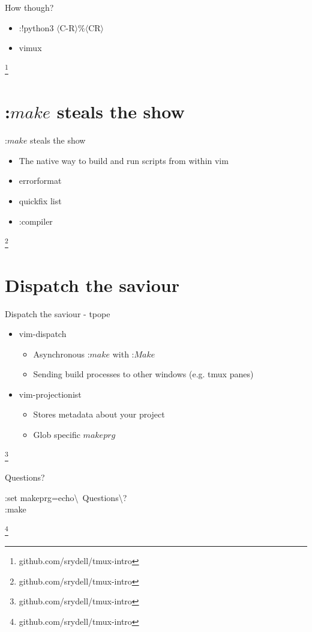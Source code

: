\documentclass[12pt]{beamer}
\newcommand\blfootnote[1]{%
  \begingroup
  \renewcommand\thefootnote{}\footnote{#1}%
  \addtocounter{footnote}{-1}%
  \endgroup
}
\begin{document}
\begin{frame}{How though?}
    \begin{itemize}
        \item :!python3 $\langle$C-R$\rangle\%\langle$CR$\rangle$
        \item vimux
    \end{itemize}
    \blfootnote{github.com/srydell/tmux-intro}
\end{frame}

\section{:$make$ steals the show}

\begin{frame}{:$make$ steals the show}
    \begin{itemize}
        \item The native way to build and run scripts from within vim
        \item errorformat
        \item quickfix list
        \item :compiler
    \end{itemize}
    \blfootnote{github.com/srydell/tmux-intro}
\end{frame}

\section{Dispatch the saviour}

\begin{frame}{Dispatch the saviour - tpope}
     \begin{itemize}
         \item vim-dispatch
         \begin{itemize}
             \item Asynchronous :$make$ with :$Make$
             \item Sending build processes to other windows (e.g. tmux panes)
         \end{itemize}
         \item vim-projectionist
         \begin{itemize}
             \item Stores metadata about your project
             \item Glob specific $makeprg$
         \end{itemize}
     \end{itemize}
     \blfootnote{github.com/srydell/tmux-intro}
\end{frame}

\begin{frame}{Questions?}
     \begin{center}
         \large :set makeprg=echo\textbackslash \ Questions\textbackslash?\\
         \LARGE :make
     \end{center}
     \blfootnote{github.com/srydell/tmux-intro}
\end{frame}
\end{document}

